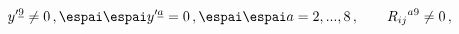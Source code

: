 \begin{equation}
y'^{\underline{9}}\neq 0 \,, \espai \espai y'^{\underline{a}}=0 \,,
\espai \espai a=2,...,8 \,,\qquad R_{ij}{}^{a9}\neq 0\,,
\label{9direction}
\end{equation}

